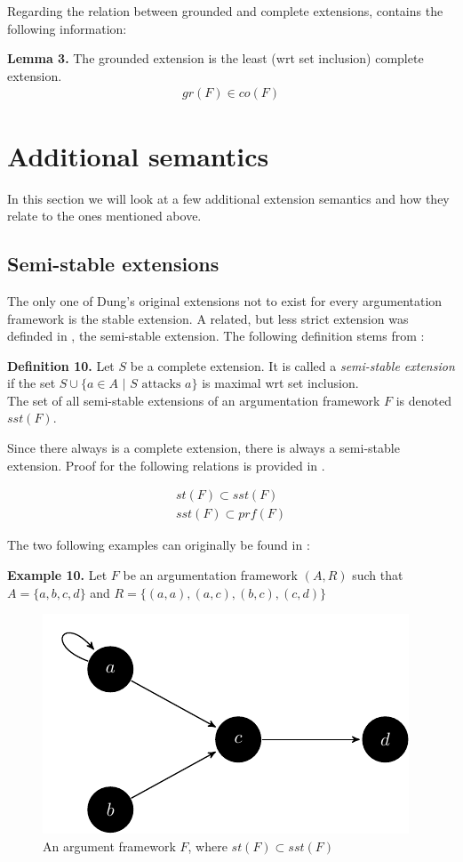 \documentclass[draft,final]{vutinfth} %
\newcommand{\hl}{\par\vspace{6pt}} %
\newcommand{\cl}{\par\vspace{12pt}} %
\begin{document}
Regarding the relation between grounded and complete extensions,\cite{Dung} contains the following information:\hl

\textbf{Lemma 3.} The grounded extension is the least (wrt set inclusion) complete extension.
\begin{align}
	gr(F)\in co(F)
\end{align}\cl

\section{Additional semantics}
In this section we will look at a few additional extension semantics and how they relate to the ones mentioned above.

\subsection{Semi-stable extensions}
The only one of Dung's original extensions not to exist for every argumentation framework is the stable extension. A related, but less strict extension was definded in \cite{Caminada}, the semi-stable extension. The following definition stems from \cite{Gorogiannis}:\hl

\textbf{Definition 10.} Let $S$ be a complete extension. It is called a \emph{semi-stable extension} if the set $S\cup\{a\in A\text{ | } S\text{ attacks }a\}$ is maximal wrt set inclusion.\\
The set of all semi-stable extensions of an argumentation framework $F$ is denoted $sst(F)$.\hl

Since there always is a complete extension, there is always a semi-stable extension.  Proof for the following relations is provided in \cite{Caminada}.

\begin{align}
	\label{eq10} st(F)\subset sst(F) \\ 
	\label{eq11} sst(F)\subset prf(F) 
\end{align}\cl

The two following examples can originally be found in \cite{Caminada}:\hl

\textbf{Example 10.} Let $F$ be an argumentation framework $(A,R)$ such that $A=\{a,b,c,d\}$ and $R=\{(a,a),(a,c),(b,c),(c,d)\}$\hl

\FloatBarrier
	\begin{figure}[!h]
		\centering
		\includegraphics[scale=1.5]{graphs/ex4.pdf}
		\caption{An argument framework $F$, where $st(F)\subset sst(F)$}
	\end{figure}
\FloatBarrier
\end{document}
